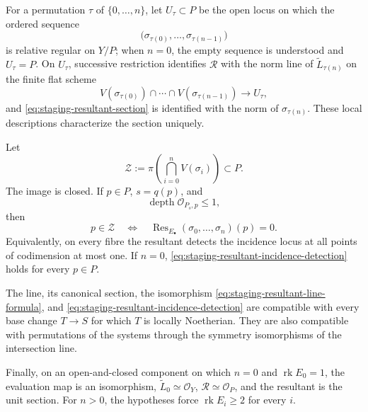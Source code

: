 \begin{theorem}
For a permutation \(\tau\) of \(\{0,\ldots,n\}\), let \(U_\tau\subset P\)
be the open locus on which the ordered sequence
\[
 \bigl(\sigma_{\tau(0)},\ldots,\sigma_{\tau(n-1)}\bigr)
\]
is relative regular on \(Y/P\); when \(n=0\), the empty sequence is
understood and
\(U_\tau=P\).  On \(U_\tau\), successive restriction identifies
\(\mathscr R\) with the norm line of
\(\widetilde L_{\tau(n)}\) on the finite flat scheme
\[
 V(\sigma_{\tau(0)})\cap\cdots\cap
 V(\sigma_{\tau(n-1)})\longrightarrow U_\tau,
\]
and \eqref{eq:staging-resultant-section} is identified with the norm of
\(\sigma_{\tau(n)}\).  These local descriptions characterize the section
uniquely.

Let
\begin{equation}\label{eq:staging-resultant-incidence}
 \mathcal Z:=\pi\left(
   \bigcap_{i=0}^n V(\sigma_i)
 \right)\subset P.
\end{equation}
The image is closed.  If \(p\in P\), \(s=q(p)\), and
\begin{equation}\label{eq:staging-resultant-depth-firewall}
 \operatorname{depth}\mathcal O_{P_s,p}\leq1,
\end{equation}
then
\begin{equation}\label{eq:staging-resultant-incidence-detection}
 p\in\mathcal Z
 \quad\Longleftrightarrow\quad
 \operatorname{Res}_{E_\bullet}(\sigma_0,\ldots,\sigma_n)(p)=0.
\end{equation}
Equivalently, on every fibre the resultant detects the incidence locus at
all points of codimension at most one.  If \(n=0\),
\eqref{eq:staging-resultant-incidence-detection} holds for every \(p\in P\).

The line, its canonical section, the isomorphism
\eqref{eq:staging-resultant-line-formula}, and
\eqref{eq:staging-resultant-incidence-detection} are compatible with every
base change \(T\to S\) for which \(T\) is locally Noetherian.  They are also
compatible with permutations of the systems through the symmetry
isomorphisms of the intersection line.

Finally, on an open-and-closed component on which \(n=0\) and
\(\operatorname{rk}E_0=1\), the evaluation map is an isomorphism,
\(\widetilde L_0\simeq\mathcal O_Y\),
\(\mathscr R\simeq\mathcal O_P\), and the resultant is the unit section.
For \(n>0\), the hypotheses force \(\operatorname{rk}E_i\geq2\) for every
\(i\).
\end{theorem}
